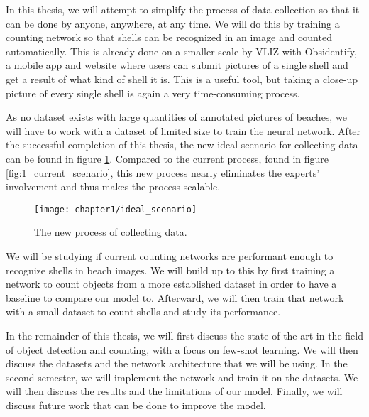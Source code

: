 In this thesis, we will attempt to simplify the process of data collection so that it can be done by anyone, anywhere, at any time. We will do this by training a counting network so that shells can be recognized in an image and counted automatically. This is already done on a smaller scale by VLIZ with Obsidentify, a mobile app and website where users can submit pictures of a single shell and get a result of what kind of shell it is. This is a useful tool, but taking a close-up picture of every single shell is again a very time-consuming process. 

As no dataset exists with large quantities of annotated pictures of beaches, we will have to work with a dataset of limited size to train the neural network. After the successful completion of this thesis, the new ideal scenario for collecting data can be found in figure \ref{fig:1_ideal_scenario}. Compared to the current process, found in figure \ref{fig:1_current_scenario}, this new process nearly eliminates the experts' involvement and thus makes the process scalable.

\begin{figure}[h]
	\centering
	\texttt{[image: chapter1/ideal\_scenario]}
	\caption{The new process of collecting data.}
	\label{fig:1_ideal_scenario}
\end{figure}

We will be studying if current counting networks are performant enough to recognize shells in beach images. We will build up to this by first training a network to count objects from a more established dataset in order to have a baseline to compare our model to. Afterward, we will then train that network with a small dataset to count shells and study its performance.

In the remainder of this thesis, we will first discuss the state of the art in the field of object detection and counting, with a focus on few-shot learning. We will then discuss the datasets and the network architecture that we will be using. In the second semester, we will implement the network and train it on the datasets. We will then discuss the results and the limitations of our model. Finally, we will discuss future work that can be done to improve the model.